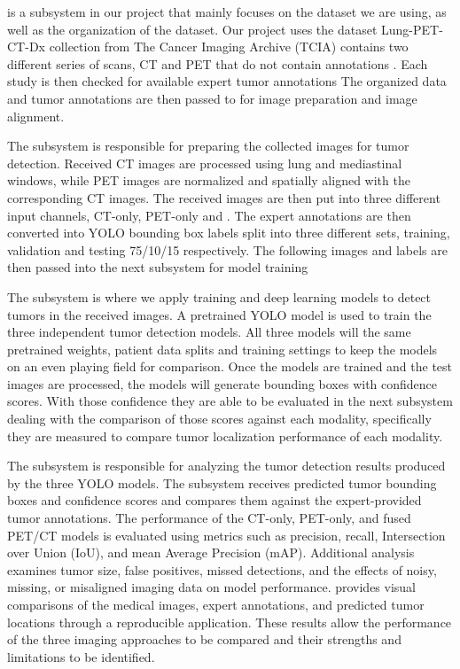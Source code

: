  is a subsystem in our project that mainly focuses on the dataset we are using, as well as the organization of the dataset. Our project uses the dataset Lung-PET-CT-Dx collection from The Cancer Imaging Archive (TCIA) contains two different series of scans, CT and PET that do not contain annotations . Each study is then checked for available expert tumor annotations The organized data and tumor annotations are then passed to  for image preparation and image alignment.

The  subsystem is responsible for preparing the collected images for tumor detection. Received CT images are processed using lung and mediastinal windows, while PET images are normalized and spatially aligned with the corresponding CT images. The received images are then put into three different input channels, CT-only, PET-only and . The expert annotations are then converted into YOLO bounding box labels split into three different sets, training, validation and testing 75/10/15 respectively. The following images and labels are then passed into the next subsystem for model training 

The  subsystem is where we apply training and deep learning models to detect tumors in the received images. A pretrained YOLO model is used to train the three independent tumor detection models. All three models will  the same pretrained weights, patient data splits and training settings to keep the models on an even playing field for comparison. Once the models are trained and the test images are processed, the models will generate bounding boxes with confidence scores. With those confidence  they are able to be evaluated in the next subsystem dealing with the comparison of those scores against each modality, specifically they are measured to compare tumor localization performance of each modality.

The  subsystem is responsible for analyzing the tumor detection results produced by the three YOLO models. The subsystem receives  predicted tumor bounding boxes and confidence scores\upd{,} and compares them against the expert-provided tumor annotations. The performance of the CT-only, PET-only, and fused PET/CT models is evaluated using metrics such as precision, recall, Intersection over Union (IoU), and mean Average Precision (mAP). Additional analysis examines tumor size, false positives, missed detections, and the effects of noisy, missing, or misaligned imaging data on model performance.  provides visual comparisons of the medical images, expert annotations, and predicted tumor locations through a reproducible application. These results allow the performance of the three imaging approaches to be compared and their strengths and limitations to be identified.

